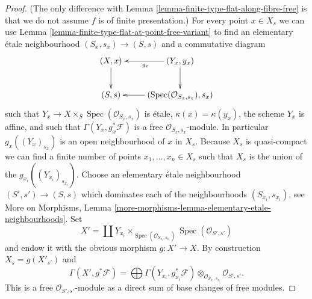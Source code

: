 \documentclass[10pt,a4paper]{amsart}
\theoremstyle{plain}
\theoremstyle{definition}
\theoremstyle{remark}
\numberwithin{equation}{subsection}
\def\Spec{\mathop{\mathrm{Spec}}}
\begin{document}
\begin{proof}
(The only difference with
Lemma \ref{lemma-finite-type-flat-along-fibre-free}
is that we do not assume $f$ is of finite presentation.)
For every point $x \in X_s$ we can use
Lemma \ref{lemma-finite-type-flat-at-point-free-variant}
to find an elementary \'etale neighbourhood $(S_x , s_x) \to (S, s)$
and a commutative diagram
$$
\xymatrix{
(X, x) \ar[d] & (Y_x, y_x) \ar[l]^{g_x} \ar[d] \\
(S, s) & (\Spec(\mathcal{O}_{S_x, s_x}), s_x) \ar[l]
}
$$
such that $Y_x \to X \times_S \Spec(\mathcal{O}_{S_x, s_x})$
is \'etale, $\kappa(x) = \kappa(y_x)$, the scheme $Y_x$ is affine, and
such that $\Gamma(Y_x, g_x^*\mathcal{F})$ is a free
$\mathcal{O}_{S_x, s_x}$-module. In particular
$g_x((Y_x)_{s_x})$ is an open neighbourhood of $x$ in $X_s$.
Because $X_s$ is quasi-compact we can find a finite number of points
$x_1, \ldots, x_n \in X_s$ such that $X_s$ is the union of
the $g_{x_i}((Y_{x_i})_{s_{x_i}})$. Choose an elementary \'etale neighbourhood
$(S' , s') \to (S, s)$ which dominates each of the neighbourhoods
$(S_{x_i}, s_{x_i})$, see
More on Morphisms,
Lemma \ref{more-morphisms-lemma-elementary-etale-neighbourhoods}.
Set
$$
X' = \coprod Y_{x_i} \times_{\Spec(\mathcal{O}_{S_{x_i}, s_{x_i}})}
\Spec(\mathcal{O}_{S', s'})
$$
and endow it with the obvious morphism $g : X' \to X$.
By construction $X_s = g(X'_{s'})$ and
$$
\Gamma(X', g^*\mathcal{F})
=
\bigoplus \Gamma(Y_{x_i}, g_{x_i}^*\mathcal{F})
\otimes_{\mathcal{O}_{S_{x_i}, s_{x_i}}}
\mathcal{O}_{S', s'}.
$$
This is a free $\mathcal{O}_{S', s'}$-module as a direct sum
of base changes of free modules.
\end{proof}
\end{document}
